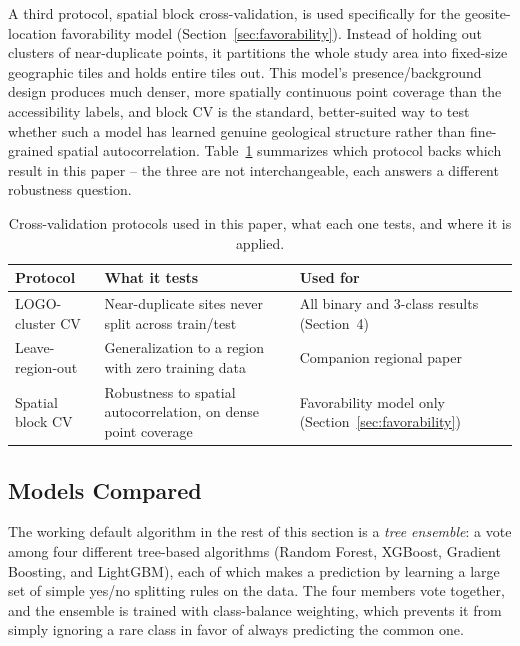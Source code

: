 \documentclass[11pt,a4paper]{article}
\begin{document}
A third protocol, spatial block cross-validation, is used specifically for the geosite-location favorability model (Section~\ref{sec:favorability}). Instead of holding out clusters of near-duplicate points, it partitions the whole study area into fixed-size geographic tiles and holds entire tiles out. This model's presence/background design produces much denser, more spatially continuous point coverage than the accessibility labels, and block CV is the standard, better-suited way to test whether such a model has learned genuine geological structure rather than fine-grained spatial autocorrelation. Table~\ref{tab:cv-protocols} summarizes which protocol backs which result in this paper -- the three are not interchangeable, each answers a different robustness question.

\begin{table}[H]
\centering\small
\caption{Cross-validation protocols used in this paper, what each one tests, and where it is applied.}
\label{tab:cv-protocols}
\begin{tabular}{@{}>{\raggedright\arraybackslash}p{3.1cm}>{\raggedright\arraybackslash}p{6.2cm}>{\raggedright\arraybackslash}p{5.6cm}@{}}
\toprule
Protocol & What it tests & Used for \\
\midrule
LOGO-cluster CV & Near-duplicate sites never split across train/test & All binary and 3-class results (Section~4) \\
Leave-region-out & Generalization to a region with zero training data & Companion regional paper \\
Spatial block CV & Robustness to spatial autocorrelation, on dense point coverage & Favorability model only (Section~\ref{sec:favorability}) \\
\bottomrule
\end{tabular}
\end{table}

\subsection{Models Compared}
\label{sec:models-compared}
The working default algorithm in the rest of this section is a \emph{tree ensemble}: a vote among four different tree-based algorithms (Random Forest, XGBoost, Gradient Boosting, and LightGBM), each of which makes a prediction by learning a large set of simple yes/no splitting rules on the data. The four members vote together, and the ensemble is trained with class-balance weighting, which prevents it from simply ignoring a rare class in favor of always predicting the common one.
\end{document}

